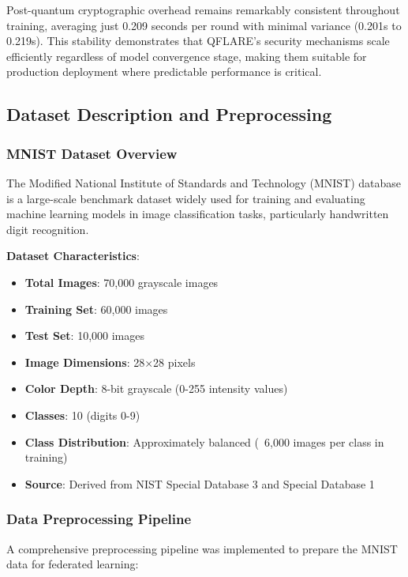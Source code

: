 \documentclass[12pt,a4paper]{article}
\begin{document}
Post-quantum cryptographic overhead remains remarkably consistent throughout training, averaging just 0.209 seconds per round with minimal variance (0.201s to 0.219s). This stability demonstrates that QFLARE's security mechanisms scale efficiently regardless of model convergence stage, making them suitable for production deployment where predictable performance is critical.

\subsection{Dataset Description and Preprocessing}

\subsubsection{MNIST Dataset Overview}

The Modified National Institute of Standards and Technology (MNIST) database is a large-scale benchmark dataset widely used for training and evaluating machine learning models in image classification tasks, particularly handwritten digit recognition.

\textbf{Dataset Characteristics}:
\begin{itemize}
    \item \textbf{Total Images}: 70,000 grayscale images
    \item \textbf{Training Set}: 60,000 images
    \item \textbf{Test Set}: 10,000 images
    \item \textbf{Image Dimensions}: 28×28 pixels
    \item \textbf{Color Depth}: 8-bit grayscale (0-255 intensity values)
    \item \textbf{Classes}: 10 (digits 0-9)
    \item \textbf{Class Distribution}: Approximately balanced (~6,000 images per class in training)
    \item \textbf{Source}: Derived from NIST Special Database 3 and Special Database 1
\end{itemize}

\subsubsection{Data Preprocessing Pipeline}

A comprehensive preprocessing pipeline was implemented to prepare the MNIST data for federated learning:
\end{document}
